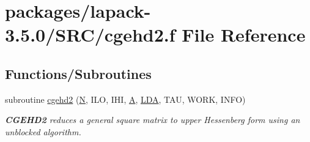 \hypertarget{cgehd2_8f}{}\section{packages/lapack-\/3.5.0/\+S\+R\+C/cgehd2.f File Reference}
\label{cgehd2_8f}
\subsection*{Functions/\+Subroutines}
\begin{DoxyCompactItemize}
\item 
subroutine \hyperlink{group__complexGEcomputational_ga4fdab2d1a2dd6e2218ea983a24c1c686}{cgehd2} (\hyperlink{polmisc_8c_a0240ac851181b84ac374872dc5434ee4}{N}, I\+L\+O, I\+H\+I, \hyperlink{classA}{A}, \hyperlink{example__user_8c_ae946da542ce0db94dced19b2ecefd1aa}{L\+D\+A}, T\+A\+U, W\+O\+R\+K, I\+N\+F\+O)
\begin{DoxyCompactList}\small\item\em {\bfseries C\+G\+E\+H\+D2} reduces a general square matrix to upper Hessenberg form using an unblocked algorithm. \end{DoxyCompactList}\end{DoxyCompactItemize}
